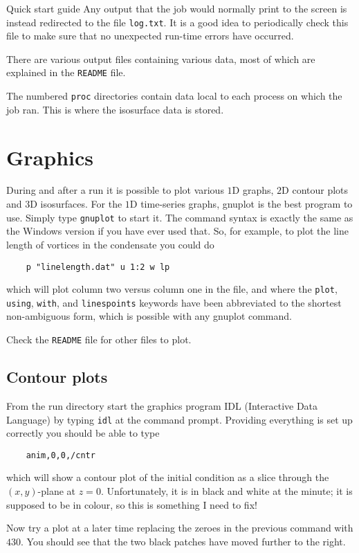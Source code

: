\begin{chapter}{\label{cha:quickstart} Quick start guide}
  Any output that the job would normally print to the screen is instead
  redirected to the file \verb"log.txt".  It is a good idea to periodically
  check this file to make sure that no unexpected run-time errors have
  occurred.

  There are various output files containing various data, most of which are
  explained in the \verb"README" file.

  The numbered \verb"proc" directories contain data local to each process on
  which the job ran.  This is where the isosurface data is stored.

  \section{Graphics}
  During and after a run it is possible to plot various $1$D graphs, $2$D
  contour plots and $3$D isosurfaces.  For the $1$D time-series graphs, gnuplot
  is the best program to use.  Simply type \verb"gnuplot" to start it.  The
  command syntax is exactly the same as the Windows version if you have ever
  used that.  So, for example, to plot the line length of vortices in the
  condensate you could do
  \begin{Verbatim}
    p "linelength.dat" u 1:2 w lp
  \end{Verbatim}
  which will plot column two versus column one in the file, and where the
  \verb"plot", \verb"using", \verb"with", and \verb"linespoints" keywords have
  been abbreviated to the shortest non-ambiguous form, which is possible with
  any gnuplot command.

  Check the \verb"README" file for other files to plot.

  \subsection{Contour plots}
  From the run directory start the graphics program IDL (Interactive Data
  Language) by typing \verb"idl" at the command prompt.  Providing everything
  is set up correctly you should be able to type
  \begin{Verbatim}
    anim,0,0,/cntr
  \end{Verbatim}
  which will show a contour plot of the initial condition as a slice through
  the $(x,y)$-plane at $z=0$.  Unfortunately, it is in black and white at the
  minute; it is supposed to be in colour, so this is something I need to fix!

  Now try a plot at a later time replacing the zeroes in the previous command
  with $430$.  You should see that the two black patches have moved further to
  the right.


\end{chapter}
